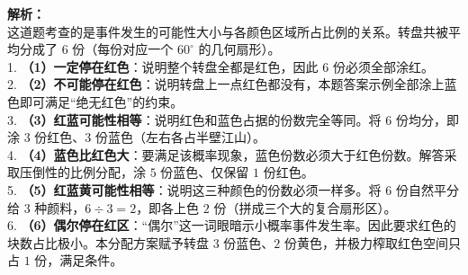 \documentclass[12pt, a4paper]{ctexrep}
\begin{document}
\begin{center}
\end{center}

\vspace{0.8cm}

{\small\color{gray}
\textbf{解析：}\\
这道题考查的是事件发生的可能性大小与各颜色区域所占比例的关系。转盘共被平均分成了 $6$ 份（每份对应一个 $60^\circ$ 的几何扇形）。\\
1. \textbf{（1）一定停在红色}：说明整个转盘全都是红色，因此 $6$ 份必须全部涂红。\\
2. \textbf{（2）不可能停在红色}：说明转盘上一点红色都没有，本题答案示例全部涂上蓝色即可满足“绝无红色”的约束。\\
3. \textbf{（3）红蓝可能性相等}：说明红色和蓝色占据的份数完全等同。将 $6$ 份均分，即涂 $3$ 份红色、$3$ 份蓝色（左右各占半壁江山）。\\
4. \textbf{（4）蓝色比红色大}：要满足该概率现象，蓝色份数必须大于红色份数。解答采取压倒性的比例分配，涂 $5$ 份蓝色、仅保留 $1$ 份红色。\\
5. \textbf{（5）红蓝黄可能性相等}：说明这三种颜色的份数必须一样多。将 $6$ 份自然平分给 $3$ 种颜料，$6 \div 3 = 2$，即各上色 $2$ 份（拼成三个大的复合扇形区）。\\
6. \textbf{（6）偶尔停在红区}：“偶尔”这一词眼暗示小概率事件发生率。因此要求红色的块数占比极小。本分配方案赋予转盘 $3$ 份蓝色、$2$ 份黄色，并极力榨取红色空间只占 $1$ 份，满足条件。
}
\end{document}
